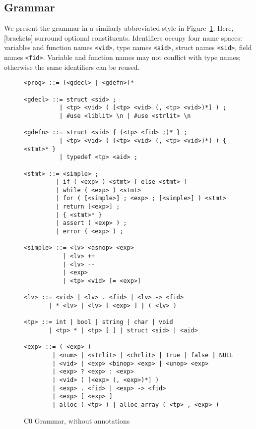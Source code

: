 \documentclass[11pt]{article}
\begin{document}
\subsection{Grammar}

We present the grammar in a similarly abbreviated style in
Figure~\ref{fig:grammar}.  Here, [brackets] surround optional
constituents.  Identifiers occupy four name spaces: variables and
function names \lstinline'<vid>', type names \lstinline'<aid>', struct names
\lstinline'<sid>', field names \lstinline'<fid>'.  Variable and function
names may not conflict with type names; otherwise the same identifiers
can be reused.

\begin{figure}
\begin{lstlisting}[basicstyle=\smallbasicstyle]
<prog> ::= (<gdecl> | <gdefn>)*

<gdecl> ::= struct <sid> ;
          | <tp> <vid> ( [<tp> <vid> (, <tp> <vid>)*] ) ;
          | #use <liblit> \n | #use <strlit> \n

<gdefn> ::= struct <sid> { (<tp> <fid> ;)* } ;
          | <tp> <vid> ( [<tp> <vid> (, <tp> <vid>)*] ) { <stmt>* }
          | typedef <tp> <aid> ;

<stmt> ::= <simple> ;
         | if ( <exp> ) <stmt> [ else <stmt> ]
         | while ( <exp> ) <stmt>
         | for ( [<simple>] ; <exp> ; [<simple>] ) <stmt>
         | return [<exp>] ;
         | { <stmt>* }
         | assert ( <exp> ) ;
         | error ( <exp> ) ;

<simple> ::= <lv> <asnop> <exp>
           | <lv> ++
           | <lv> --
           | <exp>
           | <tp> <vid> [= <exp>]

<lv> ::= <vid> | <lv> . <fid> | <lv> -> <fid>
       | * <lv> | <lv> [ <exp> ] | ( <lv> )

<tp> ::= int | bool | string | char | void
       | <tp> * | <tp> [ ] | struct <sid> | <aid>

<exp> ::= ( <exp> )
        | <num> | <strlit> | <chrlit> | true | false | NULL
        | <vid> | <exp> <binop> <exp> | <unop> <exp>
        | <exp> ? <exp> : <exp>
        | <vid> ( [<exp> (, <exp>)*] )
        | <exp> . <fid> | <exp> -> <fid>
        | <exp> [ <exp> ]
        | alloc ( <tp> ) | alloc_array ( <tp> , <exp> )
\end{lstlisting}
\caption{C0 Grammar, without annotations}
\label{fig:grammar}
\end{figure}
\end{document}
